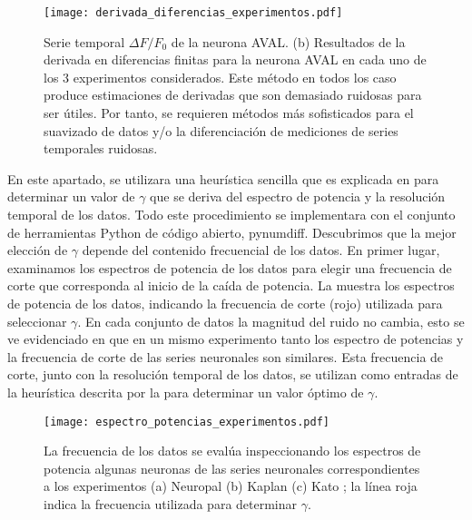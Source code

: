 \begin{figure}[h!]
	\centering{}\texttt{[image: derivada\_diferencias\_experimentos.pdf]}
	\caption[Serie temporal $\Delta F/F_0$ de la neurona AVAL. (b) Resultados de la derivada en diferencias finitas  para la neurona AVAL  en cada uno de los 3 experimentos considerados.]{Serie temporal $\Delta F/F_0$ de la neurona AVAL. (b) Resultados de la derivada en diferencias finitas  para la neurona AVAL  en cada uno de los 3 experimentos considerados. Este método en todos los caso produce estimaciones de derivadas que son demasiado ruidosas para ser útiles. Por  tanto, se requieren métodos más sofisticados para el suavizado de datos y/o la diferenciación de mediciones de series temporales ruidosas.}\label{f:derivada_diferencias_experimentos}  
\end{figure}


En este apartado,  se utilizara  una heurística sencilla que es explicada en \cite{van_breugel_numerical_2020} para determinar un valor de $\gamma$ que se deriva del espectro de potencia y la resolución temporal de los datos. Todo este procedimiento se implementara  con el conjunto de herramientas Python de código abierto, pynumdiff.  Descubrimos que la mejor elección de $\gamma$ depende del contenido frecuencial de los datos.   En primer lugar, examinamos los espectros de potencia de los datos para elegir una frecuencia de corte que corresponda al inicio de la caída de potencia.  La  muestra los espectros de potencia de los datos, indicando la frecuencia de corte (rojo) utilizada para seleccionar $\gamma$.  En cada conjunto de datos  la magnitud del ruido no cambia, esto se ve evidenciado  en que en un mismo experimento tanto los  espectro de potencias y la frecuencia de corte de las series neuronales son similares.  Esta frecuencia de corte, junto con la resolución temporal de los datos, se utilizan como entradas de la  heurística descrita por la  para determinar un valor óptimo de $\gamma$.  

\begin{figure}[h!]
	\centering{}\texttt{[image: espectro\_potencias\_experimentos.pdf]}
	\caption[La frecuencia de los datos se evalúa inspeccionando los espectros de potencia; la línea roja indica la frecuencia utilizada para determinar $\gamma$]{La frecuencia de los datos se evalúa inspeccionando los espectros de potencia algunas neuronas de las series neuronales correspondientes a  los experimentos (a) Neuropal (b) Kaplan (c) Kato ; la línea roja indica la frecuencia utilizada para determinar $\gamma$. }\label{f:espectro_potencias_experimentos}  
\end{figure}


